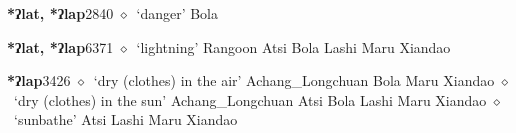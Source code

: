   \begin{list}{}{\leftmargin=1.5em \itemindent=-1.5em}
  \item {\footnotesize \textbf{*ʔlat, *ʔlap}}{\tiny 2840}
         $\diamond$~`danger'
         Bola 
  \item {\footnotesize \textbf{*ʔlat, *ʔlap}}{\tiny 6371}
\hspace{1ex}
         $\diamond$~`lightning'
         Rangoon 
\hspace{1ex}
         Atsi 
\hspace{1ex}
         Bola 
\hspace{1ex}
         Lashi 
\hspace{1ex}
         Maru 
\hspace{1ex}
         Xiandao 
  \item {\footnotesize \textbf{*ʔlap}}{\tiny 3426}
\hspace{1ex}
         $\diamond$~`dry (clothes) in the air'
         Achang\_Longchuan 
\hspace{1ex}
         Bola 
\hspace{1ex}
         Maru 
\hspace{1ex}
         Xiandao 
\hspace{1ex}
         $\diamond$~`dry (clothes) in the sun'
         Achang\_Longchuan 
\hspace{1ex}
         Atsi 
\hspace{1ex}
         Bola 
\hspace{1ex}
         Lashi 
\hspace{1ex}
         Maru 
\hspace{1ex}
         Xiandao 
\hspace{1ex}
         $\diamond$~`sunbathe'
         Atsi 
\hspace{1ex}
         Lashi 
\hspace{1ex}
         Maru 
\hspace{1ex}
         Xiandao 
  \end{list}
